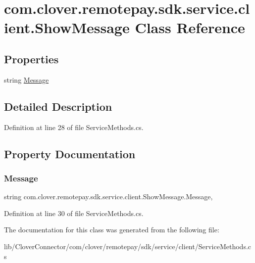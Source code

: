 \hypertarget{classcom_1_1clover_1_1remotepay_1_1sdk_1_1service_1_1client_1_1_show_message}{}\section{com.\+clover.\+remotepay.\+sdk.\+service.\+client.\+Show\+Message Class Reference}
\label{classcom_1_1clover_1_1remotepay_1_1sdk_1_1service_1_1client_1_1_show_message}
\subsection*{Properties}
\begin{DoxyCompactItemize}
\item 
string \hyperlink{classcom_1_1clover_1_1remotepay_1_1sdk_1_1service_1_1client_1_1_show_message_a101b42312c3279261d2466808ca2291a}{Message}
\end{DoxyCompactItemize}


\subsection{Detailed Description}


Definition at line 28 of file Service\+Methods.\+cs.



\subsection{Property Documentation}
\mbox{\label{classcom_1_1clover_1_1remotepay_1_1sdk_1_1service_1_1client_1_1_show_message_a101b42312c3279261d2466808ca2291a}} 
\subsubsection{\texorpdfstring{Message}{Message}}
{\footnotesize\ttfamily string com.\+clover.\+remotepay.\+sdk.\+service.\+client.\+Show\+Message.\+Message\hspace{0.3cm}{\ttfamily [get]}, {\ttfamily [set]}}



Definition at line 30 of file Service\+Methods.\+cs.



The documentation for this class was generated from the following file\+:\begin{DoxyCompactItemize}
\item 
lib/\+Clover\+Connector/com/clover/remotepay/sdk/service/client/Service\+Methods.\+cs\end{DoxyCompactItemize}
